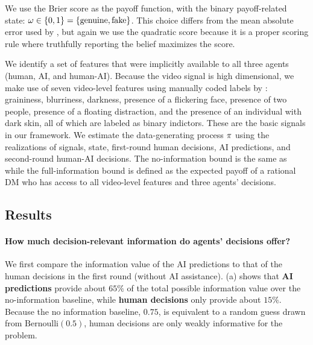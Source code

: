 We use the Brier score as the payoff function, 
with the binary payoff-related state: $\omega\in \{0,1\} = \{\text{genuine}, \text{fake}\}$.
This choice differs from the mean absolute error used by \citet{groh2022deepfake}, but again we use the quadratic score because it is a proper scoring rule where truthfully reporting the belief maximizes the score.



We identify a set of features that were implicitly available to all three agents (human, AI, and human-AI). Because the video signal is high dimensional, we make use of seven video-level features using manually coded labels by \citet{groh2022deepfake}: graininess, blurriness, darkness, presence of a flickering face, presence of two people, presence of a floating distraction, and the presence of an individual with dark skin, all of which are labeled as binary indictors.
These are the basic signals in our framework. 
We estimate the data-generating process $\pi$ using the realizations of signals, state, first-round human decisions, AI predictions, and second-round human-AI decisions.
The no-information bound is the same as  while the full-information bound is defined as the expected payoff of a rational DM who has access to all video-level features and three agents' decisions.


 \mvspace{-2mm}
\subsection{Results}
 \mvspace{-2mm}

\paragraph{How much decision-relevant information do agents' decisions offer?}
We first compare the information value of the AI predictions to that of the human decisions in the first round (without AI assistance).
(a) shows that \textbf{\textcolor{aidecision}{AI predictions}} provide about $65\%$ of the total possible information value over the no-information baseline, while \textbf{\textcolor{humandecision}{human decisions}} only provide about $15\%$.
Because the no information baseline, $0.75$, is equivalent to a random guess drawn from $\text{Bernoulli}(0.5)$, human decisions are only weakly informative for the problem.



